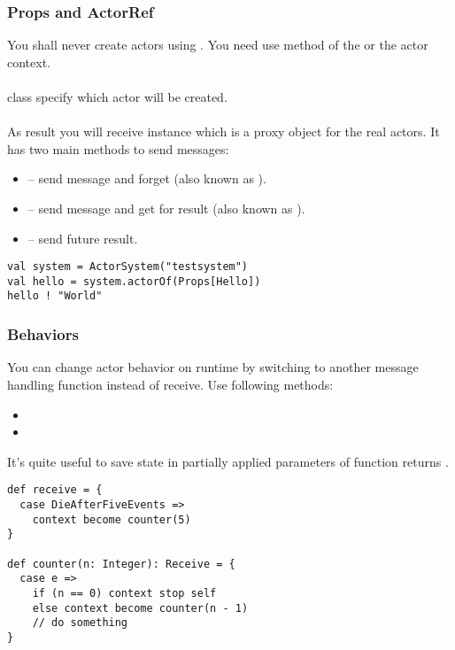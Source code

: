 \documentclass{beamer}
\begin{document}
\begin{frame}[fragile]
\frametitle{Props and ActorRef}
You shall never create actors using . You need use  method of the
 or the actor context.\\~\\

 class specify which actor will be created.\\~\\

As result you will receive  instance which is a proxy object for the real actors.
It has two main methods to send messages:
\begin{itemize}
\item \linline{!} -- send message and forget (also known as ).
\item {} -- send message and get  for result (also known as ).
\item {} -- send future result.
\end{itemize}
\begin{example}
\begin{lstlisting}
val system = ActorSystem("testsystem")
val hello = system.actorOf(Props[Hello])
hello ! "World"
\end{lstlisting}
\end{example}
\end{frame}

\begin{frame}[fragile]
\frametitle{Behaviors}
You can change actor behavior on runtime by switching to another message handling function instead
of receive. Use following  methods:
\begin{itemize}
\item {}
\item {}
\end{itemize}

It's quite useful to save state in partially applied parameters of function returns .
\begin{example}
\begin{lstlisting}
def receive = {
  case DieAfterFiveEvents =>
    context become counter(5)
}

def counter(n: Integer): Receive = {
  case e =>
    if (n == 0) context stop self
    else context become counter(n - 1)
    // do something
}
\end{lstlisting}
\end{example}
\end{frame}
\end{document}
